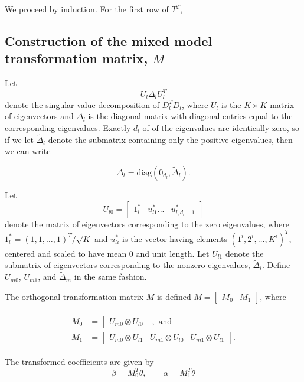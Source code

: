 \documentclass[12pt]{article}
\newcommand{\ms}{\scriptscriptstyle}
\theoremstyle{definition}
\begin{document}
We proceed by induction. For the first row of $T^T$, 

\subsection{Construction of the mixed model transformation matrix, $M$}

Let
\[
U_l \Delta_l U_l^T
\]
denote the singular value decomposition of $D_l^T D_l$, where $U_l$ is the $K \times K$ matrix of eigenvectors and $\Delta_l$ is the diagonal matrix with diagonal entries equal to the corresponding eigenvalues. Exactly $d_{\ms l}$ of of the eigenvalues are identically zero, so if we let $\tilde{\Delta}_l$ denote the submatrix containing only the positive eigenvalues, then we can write

\[
\Delta_l = \mbox{diag}\left( 0_{d_{\ms l}},\tilde{\Delta}_l \right).
\] 

Let 
\[
U_{l0} = \begin{bmatrix} 1_l^* & u_{l1}^* ... & u_{l,d_{\ms l} \ms - 1}^* \end{bmatrix}
\]
denote the matrix of eigenvectors corresponding to the zero eigenvalues, where $1_l^* = \left(1, 1, \dots,1 \right)^T/\sqrt{K}$ and $u_{li}^*$  is the vector having elements $\left( 1^i, 2^i,\dots,K^i \right)^T$, centered and scaled to have mean $0$ and unit length. Let $U_{l1}$ denote the submatrix of eigenvectors corresponding to the nonzero eigenvalues, $\tilde{\Delta}_l$. Define $U_{m0}$, $U_{m1}$, and $\tilde{\Delta}_{m}$ in the same fashion. 

The orthogonal transformation matrix $M$ is defined $M = \left[\begin{array}{c|c} M_0 & M_1 \end{array}\right]$, where

\begin{align} 
\begin{split} \label{eq:tensor-product-transformation-matrix}
M_0 &= \left[ \begin{array}{c} U_{m0} \otimes U_{l0} \end{array} \right], \mbox{ and} \\
M_1 &= \left[ \begin{array}{c|c|c}  U_{m0} \otimes U_{l1}  &  U_{m1} \otimes U_{l0}  &  U_{m1} \otimes U_{l1} \end{array} \right].
\end{split}
\end{align}

The transformed coefficients are given by 
\begin{equation*}
\beta = M_0^T\theta, \qquad \alpha = M_1^T\theta
\end{equation*}
\end{document}
